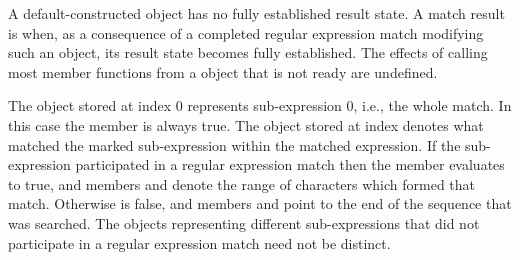 \pnum
A default-constructed  object has no fully established result state. A
match result is  when, as a consequence of a completed regular expression match
modifying such an object, its result state becomes fully established. The effects of calling
most member functions from a  object that is not ready are undefined.

\pnum
{}%
The  object stored at index 0 represents sub-expression 0,
i.e., the whole match. In this case the  member
 is always true. The 
object stored at index  denotes what matched the marked
sub-expression  within the matched expression. If the
sub-expression  participated in a regular expression 
match then the  member  evaluates to true, and
members  and  denote the range of characters
 which formed that
match. Otherwise  is false, and members 
and  point to the end of the sequence 
that was searched. \enternote The  objects representing
different sub-expressions that did not participate in a regular expression
match need not be distinct.\exitnote

